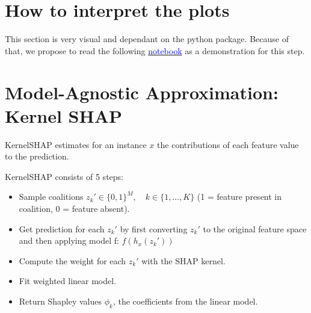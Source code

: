 \section{How to interpret the plots}

This section is very visual and dependant on the python package. Because of that, we propose to read the following \href{https://colab.research.google.com/drive/1NAeA8AKiN3Ux_cBjFTSW2A_zz-xtxR6_?usp=sharing}{\textcolor{blue}{notebook}} as a demonstration for this step.

\section{Model-Agnostic Approximation: Kernel SHAP}

KernelSHAP estimates for an instance $x$ the contributions of each feature value to the prediction.

KernelSHAP consists of 5 steps:

\begin{itemize}
    \item Sample coalitions $z_k'\in\{0,1\}^M,\quad{}k\in\{1,\ldots,K\}$ (1 = feature present in coalition, 0 = feature absent).
    \item Get prediction for each $z_k'$ by first converting $z_k'$ to the original feature space and then applying model f: $f(h_x(z_k'))$
    \item Compute the weight for each $z_k'$ with the SHAP kernel.
    \item Fit weighted linear model.
    \item Return Shapley values $\phi_k$, the coefficients from the linear model.
\end{itemize}


